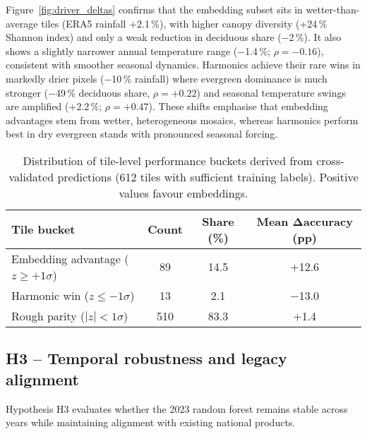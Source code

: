 \documentclass[utf8]{FrontiersinHarvard}
\begin{document}
Figure~\ref{fig:driver_deltas} confirms that the embedding subset sits in wetter-than-average tiles (ERA5 rainfall +2.1\,\%), with higher canopy diversity (+24\,\% Shannon index) and only a weak reduction in deciduous share (−2\,\%). It also shows a slightly narrower annual temperature range (−1.4\,\%; \(\rho = -0.16\)), consistent with smoother seasonal dynamics. Harmonics achieve their rare wins in markedly drier pixels (−10\,\% rainfall) where evergreen dominance is much stronger (−49\,\% deciduous share, \(\rho = +0.22\)) and seasonal temperature swings are amplified (+2.2\,\%; \(\rho = +0.47\)). These shifts emphasise that embedding advantages stem from wetter, heterogeneous mosaics, whereas harmonics perform best in dry evergreen stands with pronounced seasonal forcing.

\begin{table}[H]
    \centering
    \small
    \begin{tabular}{lccc}
        \toprule
        \textbf{Tile bucket} & \textbf{Count} & \textbf{Share (\%)} & \textbf{Mean Δaccuracy (pp)} \\
        \midrule
        Embedding advantage (\(z \ge +1\sigma\)) & 89 & 14.5 & +12.6 \\
        Harmonic win (\(z \le -1\sigma\)) & 13 & 2.1 & −13.0 \\
        Rough parity (\(|z| < 1\sigma\)) & 510 & 83.3 & +1.4 \\
        \bottomrule
    \end{tabular}
    \caption{Distribution of tile-level performance buckets derived from cross-validated predictions (612 tiles with sufficient training labels). Positive values favour embeddings.}
    \label{tab:tile_buckets}
\end{table}

\subsection{H3 -- Temporal robustness and legacy alignment}
Hypothesis H3 evaluates whether the 2023 random forest remains stable across years while maintaining alignment with existing national products.
\end{document}
